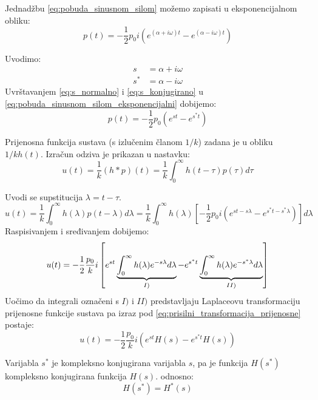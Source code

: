 Jednadžbu \eqref{eq:pobuda_sinusnom_silom} možemo zapisati u eksponencijalnom
obliku:
\begin{equation}\label{eq:pobuda_sinusnom_silom_eksponencijalni}
    p(t)=-\frac{1}{2}p_0i(e^{(\alpha+i\omega)t}-e^{(\alpha-i\omega)t})
\end{equation}

Uvodimo:
\begin{align}
    s  &= \alpha + i\omega \label{eq:s_normalno}\\
    s^* &= \alpha - i\omega \label{eq:s_konjugirano}
\end{align}
Uvrštavanjem \eqref{eq:s_normalno} i \eqref{eq:s_konjugirano} u
\eqref{eq:pobuda_sinusnom_silom_eksponencijalni} dobijemo:
\begin{equation}\label{eq:pobuda_sinusnom_silom_konacno}
    p(t) = -\frac{1}{2}p_0(e^{st}-e^{s^*t})
\end{equation}

Prijenosna funkcija sustava (s izlučenim članom $1/k$) zadana je u obliku $1/k
h(t)$. Izračun odziva je prikazan u nastavku:
\[
    u(t) = \frac{1}{k}(h*p)(t) 
         = \frac{1}{k}\int_0^\infty h(t-\tau)p(\tau)d\tau
\]

Uvodi se supstitucija $\lambda=t-\tau$.
\[
    u(t) = \frac{1}{k}\int_0^\infty h(\lambda)p(t-\lambda)d\lambda
         = \frac{1}{k}\int_0^\infty h(\lambda)\left[
             -\frac{1}{2}p_0i\left(e^{st-s\lambda}-e^{s^*t-s^*\lambda}\right)
             \right]d\lambda
\]
Raspisivanjem i sređivanjem dobijemo:
\begin{equation}\label{eq:prisilni_transformacija_prijenosne}
    u(t) = -\frac{1}{2}\frac{p_0}{k}i \left[
                e^{st}
                \underbrace{
                    \int_0^\infty h(\lambda)e^{-s\lambda}d\lambda
                }_{\text{\textbf{$I)$}}}
                -e^{s^*t}
                \underbrace{
                    \int_0^\infty h(\lambda)e^{-s^*\lambda}d\lambda
                }_{\text{\textbf{$II)$}}}
        \right]
\end{equation}
Uočimo da integrali označeni s $I)\text{ i } II)$ predstavljaju Laplaceovu
transformaciju prijenosne funkcije sustava pa izraz pod \eqref{eq:prisilni_transformacija_prijenosne}
postaje:
\begin{equation}\label{eq:prisilni_transformacija_prijenosne_kk}
    u(t)=-\frac{1}{2}\frac{p_0}{k}i(e^{st}H(s)-e^{s^*t}H(s))
\end{equation}

Varijabla $s^*$ je kompleksno konjugirana varijabla $s$, pa je funkcija
$H(s^*)$ kompleksno konjugirana funkcija $H(s)$. odnosno:
\begin{equation}\label{eq:prijenosne_odnos}
    H(s^*)=H^*(s) 
\end{equation}

